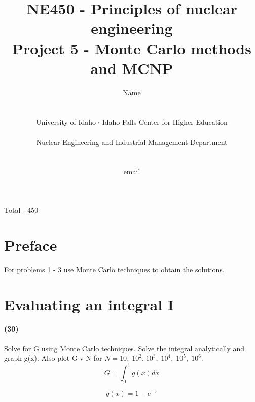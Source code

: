\documentclass[11pt,a4paper]{article}
\newcommand*\sq{\mathbin{\vcenter{\hbox{\rule{.3ex}{.3ex}}}}} %
\begin{document}
\begin{titlepage}
    \title{
        NE450 - Principles of nuclear engineering\\
        Project 5 - Monte Carlo methods and MCNP\\
    }
    \author{
        Name
        \\ \\ \\
        University of Idaho $\sq$ Idaho Falls Center for Higher Education
        \\ \\
        Nuclear Engineering and Industrial Management Department
        \\ \\ \\
        email 
    }
\clearpage %
\maketitle
\vspace*{\fill}
\begin{flushright}{
        Total - 450 
}
\end{flushright}
\thispagestyle{empty} %
\end{titlepage}

\printnoidxglossary

\newpage

\section*{Preface}
For problems 1 - 3 use Monte Carlo techniques to obtain the solutions.

\newpage

\section{Evaluating an integral I}
\paragraph*{(30)}
Solve for G using Monte Carlo techniques. Solve the integral analytically and graph g(x). Also plot G v N for $N = 10,\;10^2.\;10^3,\;10^4,\;10^5,\;10^6$.
\begin{equation}
    G = \int_0^1 g(x)dx 
\end{equation}

\begin{equation}
    g(x)=1-e^{-x}
\end{equation}
\end{document}
